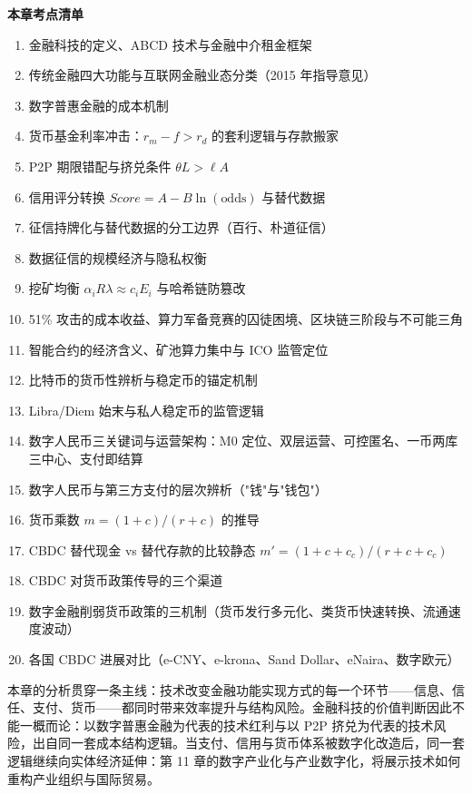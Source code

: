 \begin{chapterbox}
\textbf{本章考点清单}

\begin{enumerate}
\item 金融科技的定义、ABCD 技术与金融中介租金框架 
\item 传统金融四大功能与互联网金融业态分类（2015 年指导意见）
\item 数字普惠金融的成本机制 
\item 货币基金利率冲击：$r_m - f > r_d$ 的套利逻辑与存款搬家 
\item P2P 期限错配与挤兑条件 $\theta L > \ell A$ 
\item 信用评分转换 $Score = A - B\ln(\text{odds})$ 与替代数据 
\item 征信持牌化与替代数据的分工边界（百行、朴道征信）
\item 数据征信的规模经济与隐私权衡 
\item 挖矿均衡 $\alpha_i R\lambda \approx c_i E_i$ 与哈希链防篡改 
\item 51\% 攻击的成本收益、算力军备竞赛的囚徒困境、区块链三阶段与不可能三角 
\item 智能合约的经济含义、矿池算力集中与 ICO 监管定位 
\item 比特币的货币性辨析与稳定币的锚定机制 
\item Libra/Diem 始末与私人稳定币的监管逻辑 
\item 数字人民币三关键词与运营架构：M0 定位、双层运营、可控匿名、一币两库三中心、支付即结算 
\item 数字人民币与第三方支付的层次辨析（"钱"与"钱包"）
\item 货币乘数 $m = (1+c)/(r+c)$ 的推导 
\item CBDC 替代现金 vs 替代存款的比较静态 $m' = (1+c+c_c)/(r+c+c_c)$ 
\item CBDC 对货币政策传导的三个渠道 
\item 数字金融削弱货币政策的三机制（货币发行多元化、类货币快速转换、流通速度波动）
\item 各国 CBDC 进展对比（e-CNY、e-krona、Sand Dollar、eNaira、数字欧元）
\end{enumerate}
\end{chapterbox}

本章的分析贯穿一条主线：技术改变金融功能实现方式的每一个环节——信息、信任、支付、货币——都同时带来效率提升与结构风险。金融科技的价值判断因此不能一概而论：以数字普惠金融为代表的技术红利与以 P2P 挤兑为代表的技术风险，出自同一套成本结构逻辑。当支付、信用与货币体系被数字化改造后，同一套逻辑继续向实体经济延伸：第 11 章的数字产业化与产业数字化，将展示技术如何重构产业组织与国际贸易。
